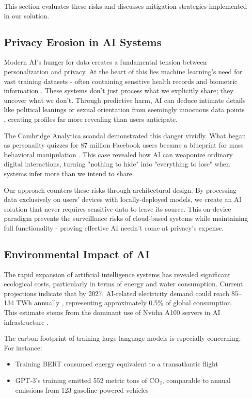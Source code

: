 \documentclass[licencjacka,en]{pracamgr}
\begin{document}
This section evaluates these risks and discusses mitigation strategies implemented in our solution.

\subsection{Privacy Erosion in AI Systems}  
Modern AI's hunger for data creates a fundamental tension between personalization and privacy. At the heart of this lies machine learning's need for vast training datasets - often containing sensitive health records and biometric information \cite{ibm_vast_data, data_guard}. These systems don't just process what we explicitly share; they uncover what we don't. Through predictive harm, AI can deduce intimate details like political leanings or sexual orientation from seemingly innocuous data points \cite{transcend}, creating profiles far more revealing than users anticipate.

The Cambridge Analytica scandal demonstrated this danger vividly. What began as personality quizzes for 87 million Facebook users became a blueprint for mass behavioral manipulation \cite{transcend}. This case revealed how AI can weaponize ordinary digital interactions, turning "nothing to hide" into "everything to lose" when systems infer more than we intend to share.

Our approach counters these risks through architectural design. By processing data exclusively on users' devices with locally-deployed models, we create an AI solution that never requires sensitive data to leave its source. This on-device paradigm prevents the surveillance risks of cloud-based systems while maintaining full functionality - proving effective AI needn't come at privacy's expense.

\subsection{Environmental Impact of AI}
The rapid expansion of artificial intelligence systems has revealed significant ecological costs, particularly in terms of energy and water consumption. Current projections indicate that by 2027, AI-related electricity demand could reach 85--134 TWh annually \cite{this_study}, representing approximately 0.5\% of global consumption. This estimate stems from the dominant use of Nvidia A100 servers in AI infrastructure \cite{nyt_el}.

The carbon footprint of training large language models is especially concerning. For instance:
\begin{itemize}
    \item Training BERT consumed energy equivalent to a transatlantic flight
    \item GPT-3's training emitted 552 metric tons of CO$_2$, comparable to annual emissions from 123 gasoline-powered vehicles \cite{sci_am_co2}
\end{itemize}
\end{document}
